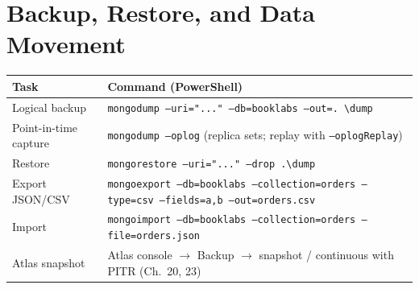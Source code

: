 \section{Backup, Restore, and Data Movement}
%
\begin{center}
\footnotesize
\begin{tabular}{@{}p{5.6cm}p{7.2cm}@{}}
\toprule
\textbf{Task} & \textbf{Command (PowerShell)} \\
\midrule
Logical backup & \texttt{mongodump --uri="..." --db=booklabs --out=. \textbackslash dump} \\
Point-in-time capture & \texttt{mongodump --oplog} (replica sets; replay with \texttt{--oplogReplay}) \\
Restore & \texttt{mongorestore --uri="..." --drop .\textbackslash dump} \\
Export JSON/CSV & \texttt{mongoexport --db=booklabs --collection=orders --type=csv --fields=a,b --out=orders.csv} \\
Import & \texttt{mongoimport --db=booklabs --collection=orders --file=orders.json} \\
Atlas snapshot & Atlas console $\to$ Backup $\to$ snapshot / continuous with PITR (Ch.~20, 23) \\
\bottomrule
\end{tabular}
\end{center}

